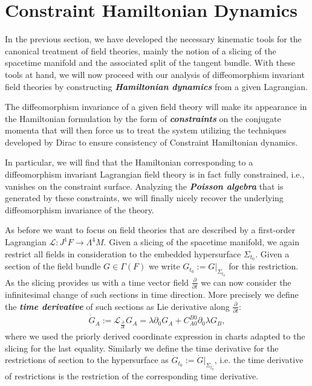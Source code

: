 \documentclass[a4paper,12pt, DIV=14, BCOR=5mm, twoside, headsepline, numbers=noenddot]{scrbook}
\begin{document}
\section{Constraint Hamiltonian Dynamics}
In the previous section, we have developed the necessary kinematic tools for the canonical treatment of field theories, mainly the notion of a slicing of the spacetime manifold and the associated split of the tangent bundle. With these tools at hand, we will now proceed with our analysis of diffeomorphism invariant field theories by constructing \textbf{\textit{Hamiltonian dynamics}} from a given Lagrangian.

The diffeomorphism invariance of a given field theory will make its appearance in the Hamiltonian formulation by the form of \textit{\textbf{constraints}} on the conjugate momenta that will then force us to treat the system utilizing the techniques developed by Dirac to ensure consistency of Constraint Hamiltonian dynamics.

In particular, we will find that the Hamiltonian corresponding to a diffeomorphism invariant Lagrangian field theory is in fact fully constrained, i.e., vanishes on the constraint surface. Analyzing the \textit{\textbf{Poisson algebra}} that is generated by these constraints, we will finally nicely recover the underlying diffeomorphism invariance of the theory.

As before we want to focus on field theories that are described by a first-order Lagrangian $\mathcal{L} : J^1F \rightarrow \Lambda^4M$. Given a slicing of the spacetime manifold, we again restrict all fields in consideration to the embedded hypersurface $\Sigma_{t_0}$. Given a section of the field bundle $G \in \Gamma(F)$ we write $G_{t_0} := G \vert _{\Sigma_{t_0}}$ for this restriction. As the slicing provides us with a time vector field $\frac{\partial}{\partial t}$ we can now consider the infinitesimal change of such sections in time direction. More precisely we define the \textbf{\textit{time derivative}} of such sections as Lie derivative along $\frac{\partial}{\partial t}$: 
\begin{align}
    \dot{G}_A := \mathcal{L}_{\frac{\partial}{\partial t}}G_A = \lambda \partial_0 G_A + C^{B0}_{A0} \partial_0 \lambda G_B,
\end{align}
where we used the priorly derived coordinate expression in charts adapted to the slicing for the last equality. Similarly we define the time derivative for the restrictions of section to the hypersurface as $\dot{G}_{t_0}:= \dot{G} \vert_{\Sigma_{t_0}}$, i.e. the time derivative of restrictions is the restriction of the corresponding time derivative.
\end{document}
